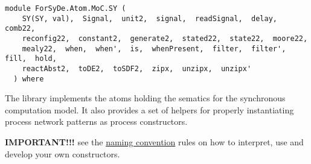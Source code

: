 \label{module:ForSyDe.Atom.MoC.SY}
\haddockbeginheader
{\haddockverb\begin{verbatim}
module ForSyDe.Atom.MoC.SY (
    SY(SY, val),  Signal,  unit2,  signal,  readSignal,  delay,  comb22, 
    reconfig22,  constant2,  generate2,  stated22,  state22,  moore22, 
    mealy22,  when,  when',  is,  whenPresent,  filter,  filter',  fill,  hold, 
    reactAbst2,  toDE2,  toSDF2,  zipx,  unzipx,  unzipx'
  ) where\end{verbatim}}
\haddockendheader

The  library implements the atoms holding the sematics for the
 synchronous computation model. It also provides a set of helpers
 for properly instantiating process network patterns as process
 constructors.\par
\textbf{IMPORTANT!!!}
 see the \href{ForSyDe-Atom.html#naming_conv}{naming convention} rules
 on how to interpret, use and develop your own constructors.\par

